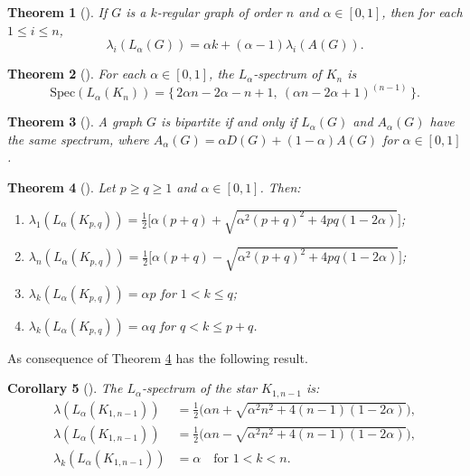 \documentclass{article}
\newtheorem{theorem}{Theorem}[section]
\newtheorem{corollary}[theorem]{Corollary}
\begin{document}
\begin{theorem}
[\cite{Carla2022}]
If $G$ is a $k$-regular graph of order $n$ and $\alpha\in[0,1]$, then for each $1\le i\le n$,
\[
\lambda_i(L_\alpha(G))=\alpha k+(\alpha-1)\lambda_i(A(G)).
\]
\end{theorem}

\begin{theorem}[\cite{Carla2022}]\label{complete}
For each $\alpha\in[0,1]$, the $L_\alpha$-spectrum of $K_n$ is
\[
\mathrm{Spec}(L_\alpha(K_n))=\{\,2\alpha n-2\alpha-n+1,\ (\alpha n-2\alpha+1)^{(n-1)}\,\}.
\]
\end{theorem}

\begin{theorem}[\cite{Wang2020}]
A graph $G$ is bipartite if and only if $L_\alpha(G)$ and $A_\alpha(G)$ have the same spectrum, where $A_\alpha(G)=\alpha D(G)+(1-\alpha)A(G)$ for $\alpha\in[0,1]$.
\end{theorem}

\begin{theorem}[\cite{Carla2022, Nikiforov2017}]
\label{car22}
Let $p\ge q\ge 1$ and $\alpha\in[0,1]$. Then:
\begin{enumerate}
\item[(1)] $\displaystyle \lambda_{1}(L_{\alpha}(K_{p,q}))=\frac{1}{2}\Big[\alpha(p+q)+\sqrt{\alpha^{2}(p+q)^{2}+4pq(1-2\alpha)}\Big]$;
\item[(2)] $\displaystyle \lambda_{n}(L_{\alpha}(K_{p,q}))=\frac{1}{2}\Big[\alpha(p+q)-\sqrt{\alpha^{2}(p+q)^{2}+4pq(1-2\alpha)}\Big]$;
\item[(3)] $\lambda_{k}(L_{\alpha}(K_{p,q}))=\alpha p$ for $1<k\le q$;
\item[(4)] $\lambda_{k}(L_{\alpha}(K_{p,q}))=\alpha q$ for $q<k\le p+q$.
\end{enumerate}
\end{theorem}

As consequence of Theorem \ref{car22} has the following result.

\begin{corollary} [\cite{Fakieh2024}]
The $L_\alpha$-spectrum of the star $K_{1,n-1}$ is:
\begin{align*}
\lambda({L_\alpha}(K_{1,n-1})) &= \tfrac{1}{2}\Big(\alpha n+\sqrt{\alpha^{2}n^{2}+4(n-1)(1-2\alpha)} \Big), \\
\lambda({L_\alpha}(K_{1,n-1})) &= \tfrac{1}{2}\Big(\alpha n-\sqrt{\alpha^{2}n^{2}+4(n-1)(1-2\alpha)} \Big), \\
\lambda_{k}({L_\alpha}(K_{1,n-1})) &= \alpha \quad \text{for } 1 < k < n.
\end{align*}
\end{corollary}
\end{document}
